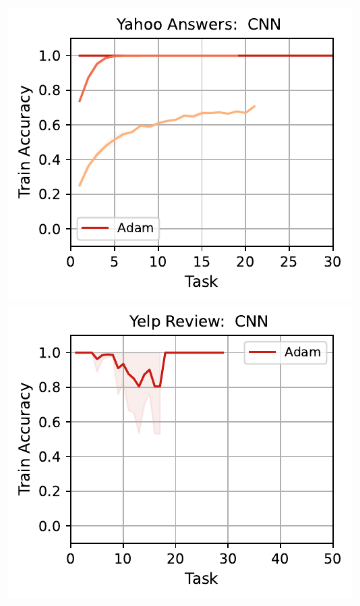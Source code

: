 \begin{figure}[htb!]
{\begin{figure}[htb!]
{        \includegraphics[width=\textwidth]{figs/Accuracy/nlp/cnn/yahoo_answers_50.pdf}
        \includegraphics[width=\textwidth]{figs/Accuracy/nlp/cnn/yelp_review_full_50.pdf}
    }
    \\
    \resizebox{\textwidth}{!}{
}
\end{figure}}
\end{figure}
